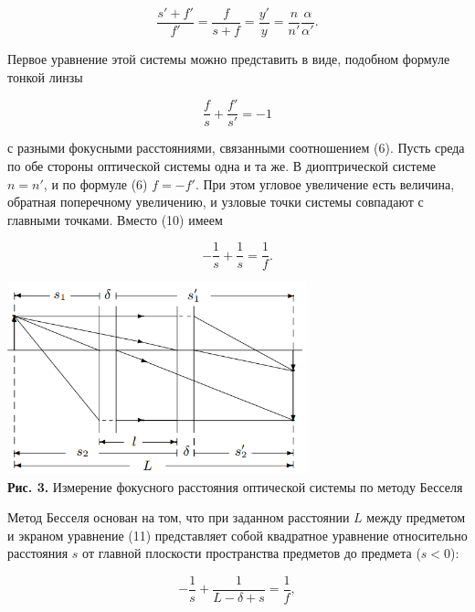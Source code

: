 \documentclass[a4paper,12pt]{article} %
\begin{document}
\begin{equation}
    \frac{s' + f'}{f'} = \frac{f}{s + f} = \frac{y'}{y} = \frac{n}{n'} \frac{\alpha}{\alpha'}.
\end{equation}

\hfill \break Первое уравнение этой системы можно представить в виде, подобном формуле тонкой линзы

\begin{equation} \label{23}
    \frac{f}{s} + \frac{f'}{s'} = -1
\end{equation}

\hfill \break с разными фокусными расстояниями, связанными соотношением (6). Пусть среда по обе стороны оптической системы одна и та же. В диоптрической системе $n = n'$, и по формуле (6) $f = -f'$. При этом угловое увеличение есть величина, обратная поперечному увеличению, и узловые точки системы совпадают с главными точками. Вместо (10) имеем

\begin{equation} \label{24}
    -\frac{1}{s} + \frac{1}{s} = \frac{1}{f}.
\end{equation}

\begin{center}
\includegraphics[width=0.65\textwidth]{4.1.1_3.png}\\
\textbf{Рис. 3.} Измерение фокусного расстояния оптической системы по методу Бесселя \\
\end{center}

\hfill \break Метод Бесселя основан на том, что при заданном расстоянии $L$ между предметом и экраном уравнение (11) представляет собой квадратное уравнение относительно расстояния $s$ от главной плоскости пространства предметов до предмета ($s < 0$):

\begin{equation}
    -\frac{1}{s} + \frac{1}{L - \delta + s} = \frac{1}{f},
\end{equation}
\end{document}
